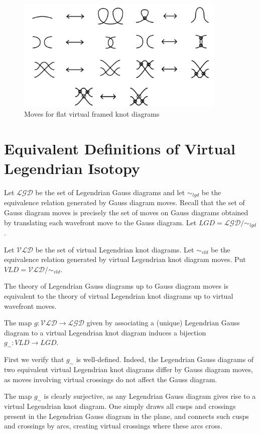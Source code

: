 \begin{figure}[htbp]
	\centering
	\includegraphics[width=10cm]{flatDiagramMoves}
	\caption{Moves for flat virtual framed knot diagrams}
	\label{flatDiagramMoves.fig}
\end{figure}


\section{Equivalent Definitions of Virtual Legendrian Isotopy}\label{equivalence}
 Let $\mathcal{LGD}$ be the set of Legendrian Gauss diagrams and let $\sim_{lgd}$ be the equivalence relation generated by Gauss diagram moves.  Recall that the set of Gauss diagram moves is precisely the set of moves on Gauss diagrams obtained by translating each wavefront move to the Gauss diagram. Let $LGD=\mathcal{LGD}/ \sim_{lgd}$.  

Let $\mathcal{VLD}$ be the set of virtual Legendrian knot diagrams.  Let $\sim_{vld}$ be the equivalence relation generated by virtual Legendrian knot diagram moves.  Put $VLD=\mathcal{VLD}/\sim_{vld}$.

The theory of Legendrian Gauss diagrams up to Gauss diagram moves is equivalent to the theory of virtual Legendrian knot diagrams up to virtual wavefront moves.

\begin{thm}  The map $g: \mathcal{VLD}\rightarrow \mathcal{LGD}$ given by associating a (unique) Legendrian Gauss diagram to a virtual Legendrian knot diagram induces a bijection $g_\sim :VLD\rightarrow LGD$.
 \end{thm}
\pp  
First we verify that $g_\sim$ is well-defined.  Indeed, the Legendrian Gauss diagrams of two equivalent virtual Legendrian knot diagrams differ by Gauss diagram moves, as moves involving virtual crossings do not affect the Gauss diagram.  

The map $g_\sim$ is clearly surjective, as any Legendrian Gauss diagram gives rise to a virtual Legendrian knot diagram.  One simply draws all cusps and crossings present in the Legendrian Gauss diagram in the plane, and connects such cusps and crossings by arcs, creating virtual crossings where these arcs cross.

